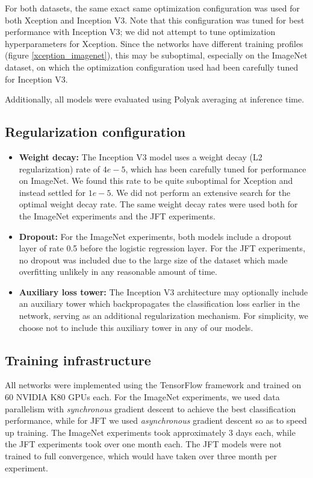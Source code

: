 For both datasets, the same exact same optimization configuration was used for both Xception and Inception V3. Note that this configuration was tuned for best performance with Inception V3; we did not attempt to tune optimization hyperparameters for Xception. Since the networks have different training profiles (figure \ref{xception_imagenet}), this may be suboptimal, especially on the ImageNet dataset, on which the optimization configuration used had been carefully tuned for Inception V3.

Additionally, all models were evaluated using Polyak averaging \cite{polyak1992} at inference time.

\subsection{Regularization configuration}

\begin{itemize}
\item \textbf{Weight decay:} The Inception V3 model uses a weight decay (L2 regularization) rate of $4e-5$, which has been carefully tuned for performance on ImageNet. We found this rate to be quite suboptimal for Xception and instead settled for $1e-5$. We did not perform an extensive search for the optimal weight decay rate. The same weight decay rates were used both for the ImageNet experiments and the JFT experiments.

\item \textbf{Dropout:} For the ImageNet experiments, both models include a dropout layer of rate 0.5 before the logistic regression layer. For the JFT experiments, no dropout was included due to the large size of the dataset which made overfitting unlikely in any reasonable amount of time.

\item \textbf{Auxiliary loss tower:} The Inception V3 architecture may optionally include an auxiliary tower which backpropagates the classification loss earlier in the network, serving as an additional regularization mechanism. For simplicity, we choose not to include this auxiliary tower in any of our models.

\end{itemize}

\subsection{Training infrastructure}

All networks were implemented using the TensorFlow framework \cite{tensorflow2015-whitepaper} and trained on 60 NVIDIA K80 GPUs each. For the ImageNet experiments, we used data parallelism with \textit{synchronous} gradient descent to achieve the best classification performance, while for JFT we used \textit{asynchronous} gradient descent so as to speed up training. The ImageNet experiments took approximately 3 days each, while the JFT experiments took over one month each. The JFT models were not trained to full convergence, which would have taken over three month per experiment.

